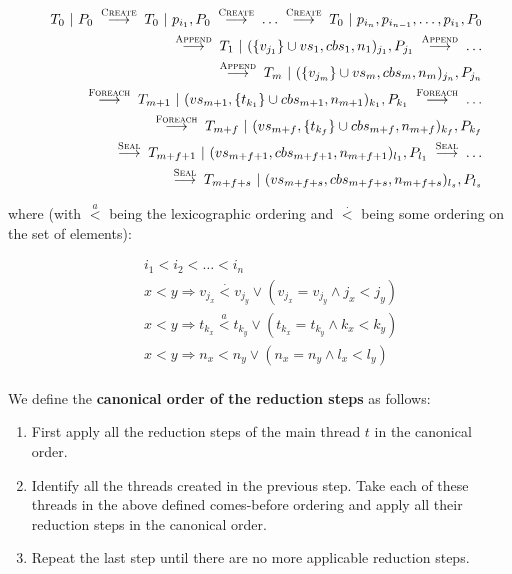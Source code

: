 \documentclass[runningheads,a4paper]{llncs}
\newcommand{\set}[1]{\{#1\}}
\begin{document}
\begin{definition}
\begin{eqnarray*}
& &T_0~|~P_0 \;\stackrel{\textsc{Create}}{\longrightarrow}\; T_0~|~p_{i_1},
P_0 \;\stackrel{\textsc{Create}}{\longrightarrow}\; \ldots
\;\stackrel{\textsc{Create}}{\longrightarrow}\;  T_0~|~p_{i_n},
p_{i_{n-1}}, \ldots, p_{i_1}, P_0 \\
& &\;\stackrel{\textsc{Append}}{\longrightarrow}\; T_1~|~(\set{v_{j_1}}
\cup vs_1, cbs_1, n_1)_{j_1}, P_{j_1}
\;\stackrel{\textsc{Append}}{\longrightarrow}\; \ldots \\
& &\;\stackrel{\textsc{Append}}{\longrightarrow}\;
T_m~|~(\set{v_{j_m}} \cup vs_m, cbs_m, n_m)_{j_n}, P_{j_n} \\
& & \;\stackrel{\textsc{Foreach}}{\longrightarrow}\;
T_{m+1}~|~(vs_{m+1}, \set{t_{k_1}} \cup cbs_{m+1}, n_{m+1})_{k_1}, P_{k_1}
\;\stackrel{\textsc{Foreach}}{\longrightarrow}\; \ldots \\
& & \;\stackrel{\textsc{Foreach}}{\longrightarrow}\;
T_{m+f}~|~(vs_{m+f}, \set{t_{k_f}} \cup cbs_{m+f}, n_{m+f})_{k_f}, P_{k_f} \\
& & \;\stackrel{\textsc{Seal}}{\longrightarrow}\;
T_{m+f+1}~|~(vs_{m+f+1}, cbs_{m+f+1}, n_{m+f+1})_{l_1}, P_{l_1}
\;\stackrel{\textsc{Seal}}{\longrightarrow}\; \ldots \\
& & \;\stackrel{\textsc{Seal}}{\longrightarrow}\;
T_{m+f+s}~|~(vs_{m+f+s}, cbs_{m+f+s}, n_{m+f+s})_{l_s}, P_{l_s}
\end{eqnarray*}

where (with $\stackrel{a}{<}$ being the lexicographic ordering and
$\stackrel{\cdot}{<}$ being some ordering on the set of elements):

\begin{eqnarray*}
& &i_1 < i_2 < \ldots < i_n \\
& &x < y \Rightarrow v_{j_x} \stackrel{\cdot}{<} v_{j_y} \vee (v_{j_x}
= v_{j_y} \wedge j_x < j_y)\\
& &x < y \Rightarrow t_{k_x} \stackrel{a}{<} t_{k_y} \vee (t_{k_x}
= t_{k_y} \wedge k_x < k_y)\\
& &x < y \Rightarrow n_x < n_y \vee (n_x = n_y \wedge l_x < l_y)\\
\end{eqnarray*}

We define the \textbf{canonical order of the reduction steps}
as follows:
\begin{enumerate}
\item First apply all the reduction steps of the main thread $t$ in
  the canonical order.
\item Identify all the threads created in the previous step. Take each
  of these threads in the above defined comes-before ordering and
  apply all their reduction steps in the canonical order.
\item Repeat the last step until there are no more applicable
  reduction steps.
\end{enumerate}


\end{definition}
\end{document}
